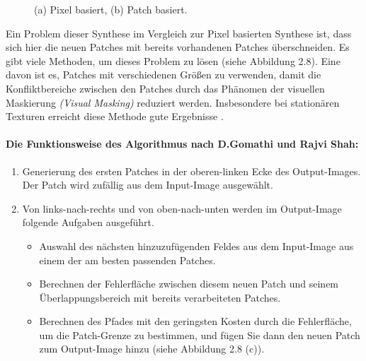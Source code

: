 \documentclass[12pt, a4paper,twoside,openany]{report} %
\begin{document}
\begin{figure}[H]
    \centering
    \qquad
    \caption{(a) Pixel basiert, (b) Patch basiert.}%
\end{figure}

Ein Problem dieser Synthese im Vergleich zur Pixel basierten Synthese ist, dass sich hier die neuen Patches mit bereits vorhandenen Patches überschneiden.
Es gibt viele Methoden, um dieses Problem zu lösen {(siehe Abbildung 2.8)}.
Eine davon ist es, Patches mit verschiedenen Größen zu verwenden, damit die Konfliktbereiche zwischen den Patches durch das Phänomen der visuellen Maskierung
\textit{(Visual Masking)} reduziert werden.
Insbesondere bei stationären Texturen erreicht diese Methode gute Ergebnisse \cite{EfrosQuilt}.

\paragraph{Die Funktionsweise des Algorithmus nach D.Gomathi und Rajvi Shah:}

\begin{enumerate}
    \item Generierung des ersten Patches in der oberen-linken Ecke des Output-Images. Der Patch wird zufällig aus dem Input-Image ausgewählt.
    \item Von links-nach-rechts und von oben-nach-unten werden im Output-Image folgende Aufgaben ausgeführt.
    \begin{itemize}
        \item Auswahl des nächsten hinzuzufügenden Feldes aus dem Input-Image aus einem der am besten passenden Patches.
        \item Berechnen der Fehlerfläche zwischen diesem neuen Patch und seinem Überlappungsbereich mit bereits
        verarbeiteten Patches.
        \item Berechnen des Pfades mit den geringsten Kosten durch die Fehlerfläche, um die Patch-Grenze zu bestimmen, und fügen Sie dann den neuen Patch zum Output-Image hinzu {(siehe Abbildung 2.8 (c))}.
    \end{itemize}
\end{enumerate}
\end{document}
